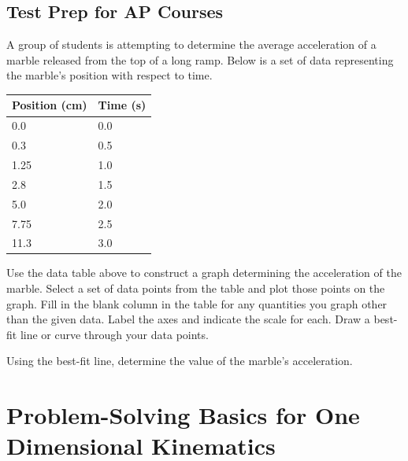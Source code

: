 \documentclass[
]{book}
\newenvironment{ap-test-prep}{}{}
\begin{document}
\hypertarget{fs-id2388866}{}
\begin{ap-test-prep}

\hypertarget{test-prep-for-ap-courses-4}{%
\subsection{Test Prep for AP Courses}\label{test-prep-for-ap-courses-4}}

\hypertarget{fs-id1844508}{}
\leavevmode\hypertarget{fs-id1844512}{}%
A group of students is attempting to determine the average acceleration
of a marble released from the top of a long ramp. Below is a set of data
representing the marble's position with respect to time.

\begin{longtable}[]{@{}ll@{}}
\toprule
Position (cm) & Time (s)\tabularnewline
\midrule
\endhead
0.0 & 0.0\tabularnewline
0.3 & 0.5\tabularnewline
1.25 & 1.0\tabularnewline
2.8 & 1.5\tabularnewline
5.0 & 2.0\tabularnewline
7.75 & 2.5\tabularnewline
11.3 & 3.0\tabularnewline
\bottomrule
\end{longtable}

Use the data table above to construct a graph determining the
acceleration of the marble. Select a set of data points from the table
and plot those points on the graph. Fill in the blank column in the
table for any quantities you graph other than the given data. Label the
axes and indicate the scale for each. Draw a best-fit line or curve
through your data points.

Using the best-fit line, determine the value of the marble's
acceleration.

\end{ap-test-prep}

\hypertarget{problem-solving-basics-for-one-dimensional-kinematics}{%
\section{Problem-Solving Basics for One Dimensional Kinematics}\label{problem-solving-basics-for-one-dimensional-kinematics}}
\end{document}
